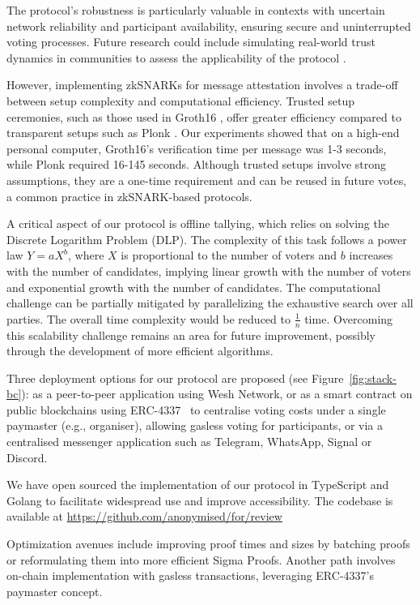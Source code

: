 \documentclass[runningheads]{llncs}
\begin{document}
The protocol's robustness is particularly valuable in contexts with uncertain network reliability and participant availability, ensuring secure and uninterrupted voting processes. Future research could include simulating real-world trust dynamics in communities to assess the applicability of the protocol \cite{healdMathematicalDescriptionTrust2019}.

However, implementing zkSNARKs for message attestation involves a trade-off between setup complexity and computational efficiency. Trusted setup ceremonies, such as those used in Groth16 \cite{grothSizePairingbasedNoninteractive2016}, offer greater efficiency compared to transparent setups such as Plonk \cite{gabizonPlonkPermutationsLagrangebases2019a}. Our experiments showed that on a high-end personal computer, Groth16's verification time per message was 1-3 seconds, while Plonk required 16-145 seconds. Although trusted setups involve strong assumptions, they are a one-time requirement and can be reused in future votes, a common practice in zkSNARK-based protocols.

A critical aspect of our protocol is offline tallying, which relies on solving the Discrete Logarithm Problem (DLP). The complexity of this task follows a power law \( Y = aX^b \), where \( X \) is proportional to the number of voters and \( b \) increases with the number of candidates, implying linear growth with the number of voters and exponential growth with the number of candidates. The computational challenge can be partially mitigated by parallelizing the exhaustive search over all parties. The overall time complexity would be reduced to $\frac{1}{n}$ time. Overcoming this scalability challenge remains an area for future improvement, possibly through the development of more efficient algorithms.

Three deployment options for our protocol are proposed (see Figure~\ref{fig:stack-bc}): as a peer-to-peer application using Wesh Network, or as a smart contract on public blockchains using ERC-4337~\cite{ERC4337AccountAbstraction} to centralise voting costs under a single paymaster (e.g., organiser), allowing gasless voting for participants, or via a centralised messenger application such as Telegram, WhatsApp, Signal or Discord.

We have open sourced the implementation of our protocol in TypeScript and Golang to facilitate widespread use and improve accessibility. The codebase is available at \url{https://github.com/anonymised/for/review}

Optimization avenues include improving proof times and sizes by batching proofs or reformulating them into more efficient Sigma Proofs. Another path involves on-chain implementation with gasless transactions, leveraging ERC-4337's paymaster concept.
\end{document}
